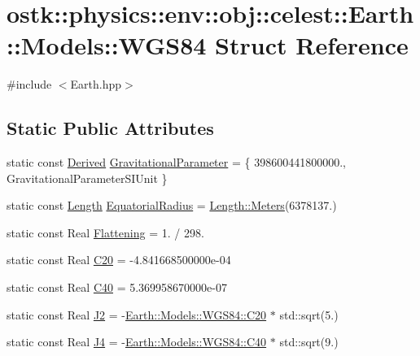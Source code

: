 \hypertarget{structostk_1_1physics_1_1env_1_1obj_1_1celest_1_1_earth_1_1_models_1_1_w_g_s84}{}\section{ostk\+:\+:physics\+:\+:env\+:\+:obj\+:\+:celest\+:\+:Earth\+:\+:Models\+:\+:W\+G\+S84 Struct Reference}
\label{structostk_1_1physics_1_1env_1_1obj_1_1celest_1_1_earth_1_1_models_1_1_w_g_s84}


{\ttfamily \#include $<$Earth.\+hpp$>$}

\subsection*{Static Public Attributes}
\begin{DoxyCompactItemize}
\item 
static const \hyperlink{classostk_1_1physics_1_1units_1_1_derived}{Derived} \hyperlink{structostk_1_1physics_1_1env_1_1obj_1_1celest_1_1_earth_1_1_models_1_1_w_g_s84_ad9da871753c1f2bbe4f4d8ad2faf11ba}{Gravitational\+Parameter} = \{ 398600441800000., Gravitational\+Parameter\+S\+I\+Unit \}
\item 
static const \hyperlink{classostk_1_1physics_1_1units_1_1_length}{Length} \hyperlink{structostk_1_1physics_1_1env_1_1obj_1_1celest_1_1_earth_1_1_models_1_1_w_g_s84_a87a056bc54308532e8148c9d9addca5d}{Equatorial\+Radius} = \hyperlink{classostk_1_1physics_1_1units_1_1_length_ad227977ce00756791595796a0dd5ddd7}{Length\+::\+Meters}(6378137.)
\item 
static const Real \hyperlink{structostk_1_1physics_1_1env_1_1obj_1_1celest_1_1_earth_1_1_models_1_1_w_g_s84_abf5d54a510bb9f9ba11cecdb60a16e17}{Flattening} = 1. / 298.
\item 
static const Real \hyperlink{structostk_1_1physics_1_1env_1_1obj_1_1celest_1_1_earth_1_1_models_1_1_w_g_s84_ae42abb8da1cf5323b3b01e604a2743ce}{C20} = -\/4.\+841668500000e-\/04
\item 
static const Real \hyperlink{structostk_1_1physics_1_1env_1_1obj_1_1celest_1_1_earth_1_1_models_1_1_w_g_s84_ae9d28142169c46e5b199384a7559dea9}{C40} = 5.\+369958670000e-\/07
\item 
static const Real \hyperlink{structostk_1_1physics_1_1env_1_1obj_1_1celest_1_1_earth_1_1_models_1_1_w_g_s84_ac4a0736f324dc3faf5f5b279e7daac45}{J2} = -\/\hyperlink{structostk_1_1physics_1_1env_1_1obj_1_1celest_1_1_earth_1_1_models_1_1_w_g_s84_ae42abb8da1cf5323b3b01e604a2743ce}{Earth\+::\+Models\+::\+W\+G\+S84\+::\+C20} $\ast$ std\+::sqrt(5.)
\item 
static const Real \hyperlink{structostk_1_1physics_1_1env_1_1obj_1_1celest_1_1_earth_1_1_models_1_1_w_g_s84_a6f1fb23baa37eec49b9dfa0d3de03c08}{J4} = -\/\hyperlink{structostk_1_1physics_1_1env_1_1obj_1_1celest_1_1_earth_1_1_models_1_1_w_g_s84_ae9d28142169c46e5b199384a7559dea9}{Earth\+::\+Models\+::\+W\+G\+S84\+::\+C40} $\ast$ std\+::sqrt(9.)
\end{DoxyCompactItemize}


